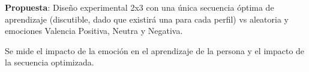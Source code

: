 \textbf{Propuesta}: 
Diseño experimental 2x3 con una única secuencia óptima de aprendizaje (discutible, dado que existirá una para cada perfil) vs aleatoria y emociones Valencia Positiva, Neutra y Negativa. 

Se mide el impacto de la emoción en el aprendizaje de la persona y el impacto de la secuencia optimizada. 